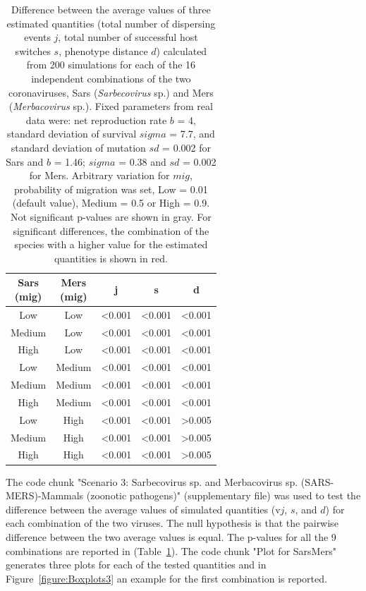 \begin{table}[htbp]
\centering
\caption{Difference between the average values of three estimated quantities (total number of dispersing events $j$, total number of successful host switches $s$, phenotype distance $d$) calculated from 200 simulations for each of the 16 independent combinations of the two coronaviruses, Sars (\textit{Sarbecovirus} sp.) and Mers (\textit{Merbacovirus} sp.). Fixed parameters from real data were: net reproduction rate $b$ = 4, standard deviation of survival $sigma$ = 7.7, and standard deviation of mutation $sd$ = 0.002 for Sars and $b$ = 1.46; $sigma$ = 0.38 and $sd$ = 0.002  for Mers.
Arbitrary variation for $mig$, probability of migration was set,  Low = 0.01 (default value), Medium = 0.5 or High = 0.9. Not significant p-values are shown in gray. For significant differences, the combination of the species with a higher value for the estimated quantities is shown in red.}
\label{tab:comparison3}
\begin{tabular}{|c|c|c|c|c|}
\hline

 \hline
   \makecell{\textbf{Sars} \\ (mig)} & \makecell{\textbf{Mers} \\ (mig)} & \textbf{j} & \textbf{s} & \textbf{d} \\
 \hline\hline
  \color{red}Low & Low&<0.001&<0.001&<0.001\\
  \color{red}Medium & Low&<0.001&<0.001&<0.001\\
  \color{red}High & Low&<0.001&<0.001&<0.001\\
  \color{red}Low & Medium&<0.001&<0.001&<0.001\\
  \color{red}Medium & Medium&<0.001&<0.001&<0.001\\
  \color{red}High & Medium&<0.001&<0.001&<0.001\\
  Low & \color{red}High&<0.001&<0.001&\color{gray}>0.005\\
  \color{red}Medium & High&<0.001&<0.001&\color{gray}>0.005\\
  \color{red}High & High&<0.001&<0.001&\color{gray}>0.005\\
  \hline
 \end{tabular}
 \end{table}
 
The code chunk "Scenario 3: Sarbecovirus sp. and Merbacovirus sp. (SARS-MERS)-Mammals (zoonotic pathogens)"  (supplementary file) was used to test  the difference between the average values of simulated quantities (v$j$, $s$, and $d$) for each combination of the two viruses.
 The null hypothesis is that the pairwise difference between the two average values is equal. The p-values for all the 9 combinations are reported in (Table~\ref{tab:comparison3}). 
The code chunk "Plot for SarsMers" generates three plots for each of the tested quantities and in Figure~\ref{figure:Boxplots3} an example for the first combination is reported.

